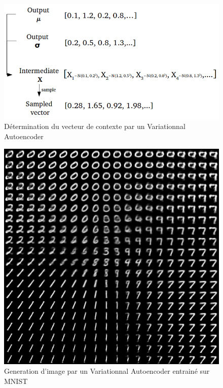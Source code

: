\begin{figure}
    \centering
    \includegraphics[scale=0.2]{./tex/encoder-decoder-network/varauto2.png}
    \caption{Détermination du vecteur de contexte par un Variationnal Autoencoder}
    \label{varauto2}
\end{figure}

\begin{figure}
    \centering
    \includegraphics[scale=0.2]{./tex/encoder-decoder-network/varauto3.png}
    \caption{Generation d'image par un Variationnal Autoencoder entrainé sur MNIST}
    \label{varauto3}
\end{figure}
